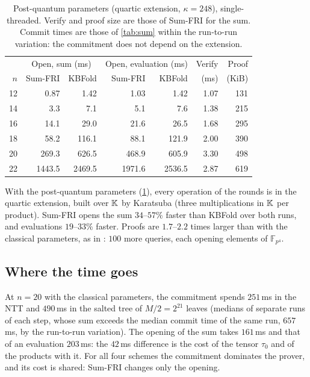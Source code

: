 \begin{table}[t]
\centering
\small
\begin{tabular}{r rr rr rr}
\toprule
 & \multicolumn{2}{c}{Open, sum (ms)} & \multicolumn{2}{c}{Open, evaluation (ms)} & Verify & Proof \\
$n$ & Sum-FRI & KBFold & Sum-FRI & KBFold & (ms) & (KiB) \\
\midrule
12 & 0.87 & 1.42 & 1.03 & 1.42 & 1.07 & 131 \\
14 & 3.3 & 7.1 & 5.1 & 7.6 & 1.38 & 215 \\
16 & 14.1 & 29.0 & 21.6 & 26.5 & 1.68 & 295 \\
18 & 58.2 & 116.1 & 88.1 & 121.9 & 2.00 & 390 \\
20 & 269.3 & 626.5 & 468.9 & 605.9 & 3.30 & 498 \\
22 & 1443.5 & 2469.5 & 1971.6 & 2536.5 & 2.87 & 619 \\
\bottomrule
\end{tabular}
\caption{Post-quantum parameters (quartic extension, $\kappa = 248$), single-threaded. Verify and proof size are those of Sum-FRI for the sum. Commit times are those of \cref{tab:sum} within the run-to-run variation: the commitment does not depend on the extension.}
\label{tab:pq}
\end{table}

With the post-quantum parameters (\cref{tab:pq}), every operation of the rounds is in the quartic extension, built over $\mathbb{K}$ by Karatsuba (three multiplications in $\mathbb{K}$ per product).
Sum-FRI opens the sum $34$--$57\%$ faster than KBFold over both runs, and evaluations $19$--$33\%$ faster.
Proofs are $1.7$--$2.2$ times larger than with the classical parameters, as in : $100$ more queries, each opening elements of $\mathbb{F}_{p^4}$.

\subsection{Where the time goes}\label{sec:exp:breakdown}

At $n = 20$ with the classical parameters, the commitment spends $251$\,ms in the NTT and $490$\,ms in the salted tree of $M/2 = 2^{21}$ leaves (medians of separate runs of each step, whose sum exceeds the median commit time of the same run, $657$\,ms, by the run-to-run variation).
The opening of the sum takes $161$\,ms and that of an evaluation $203$\,ms: the $42$\,ms difference is the cost of the tensor $\tau_0$ and of the products with it.
For all four schemes the commitment dominates the prover, and its cost is shared: Sum-FRI changes only the opening.

